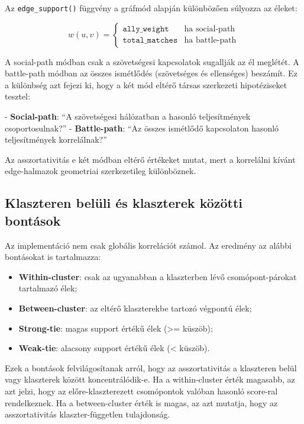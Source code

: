 ﻿\documentclass[a4paper,12pt]{report}
\begin{document}
Az \texttt{edge\_support()} függvény a gráfmód alapján különbözően súlyozza az éleket:

\begin{equation}
w(u,v) = \begin{cases}
\texttt{ally\_weight} & \text{ha } \text{social-path} \\
\texttt{total\_matches} & \text{ha } \text{battle-path}
\end{cases}
\end{equation}

A social-path módban csak a szövetségesi kapcsolatok sugallják az él meglétét. A battle-path módban az összes ismétlődés (szövetséges és ellenséges) beszámít. Ez a különbség azt fejezi ki, hogy a két mód eltérő társas szerkezeti hipotéziseket tesztel:

- \textbf{Social-path}: ``A szövetségesi hálózatban a hasonló teljesítmények csoportosulnak?''
- \textbf{Battle-path}: ``Az összes ismétlődő kapcsolaton hasonló teljesítmények korrelálnak?''

Az asszortativitás e két módban eltérő értékeket mutat, mert a korrelálni kívánt edge-halmazok geometriai szerkezetileg különböznek.

\subsection{Klaszteren belüli és klaszterek közötti bontások}

Az implementáció nem csak globális korrelációt számol. Az eredmény az alábbi bontásokat is tartalmazza:

\begin{itemize}
    \item \textbf{Within-cluster}: csak az ugyanabban a klaszterben lévő csomópont-párokat tartalmazó élek;
    \item \textbf{Between-cluster}: az eltérő klaszterekbe tartozó végpontú élek;
    \item \textbf{Strong-tie}: magas support értékű élek (>= küszöb);
    \item \textbf{Weak-tie}: alacsony support értékű élek (< küszöb).
\end{itemize}

Ezek a bontások felvilágosítanak arról, hogy az asszortativitás a klaszteren belül vagy klaszterek között koncentrálódik-e. Ha a within-cluster érték magasabb, az azt jelzi, hogy az előre-klaszterezett csomópontok valóban hasonló score-ral rendelkeznek. Ha a between-cluster érték is magas, az azt mutatja, hogy az asszortativitás klaszter-független tulajdonság.
\end{document}
